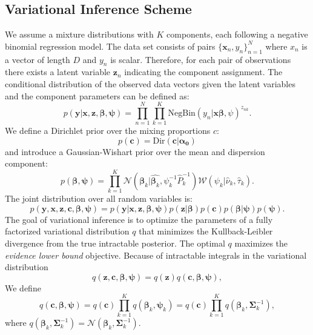 \documentclass[a4paper,UKenglish]{oasics-v2016}
\begin{document}
\subsection{Variational Inference Scheme}
We assume a mixture distributions with $K$ components, each following a negative binomial regression model.
The data set consists of pairs $\lbrace \mathbf{x}_n, y_n \rbrace^N_{n=1}$ where $x_n$ is a vector of length $D$ and $y_n$ is scalar. Therefore, for each pair of observations %
there exists a latent variable $\mathbf{z}_n$ indicating the component assignment. The conditional distribution of the observed data vectors given the latent variables and the component parameters can be defined as:
$$
p(\mathbf{y}|\mathbf{x},\mathbf{z},\boldsymbol{\beta},\boldsymbol{\psi}) = \prod_{n=1}^N \prod_{k=1}^{K} \text{NegBin}(y_n|\boldsymbol{x}\boldsymbol{\beta},\psi)^{z_{nk}}.%
$$
We define a Dirichlet prior over the mixing proportions $c$:
$$
p(\mathbf{c}) = \text{Dir}(\mathbf{c}|\boldsymbol{\alpha_0})
$$
and introduce a Gaussian-Wishart prior over the mean and dispersion component:
$$
p(\boldsymbol{\beta}, \boldsymbol{\psi})=\prod_{k=1}^{K}\mathcal{N}(\boldsymbol{\beta}_k|\hat{\boldsymbol{\beta}_k},\psi_k^{-1} \hat P_k^{-1}) \mathcal{W}(\psi_k|\hat \nu_k, \hat \tau_k).
$$
The joint distribution over all random variables is:
$$
p(\mathbf{y},\mathbf{x},\mathbf{z},\boldsymbol{c},\boldsymbol{\beta},\boldsymbol{\psi})=p(\mathbf{y}|\mathbf{x}, \mathbf{z},\boldsymbol \beta,\boldsymbol \psi)p(\boldsymbol{z}|\boldsymbol \beta)p(\boldsymbol{c})p(\boldsymbol{\beta}|\boldsymbol \psi)p(\boldsymbol \psi).
$$
The goal of variational inference is to optimize the parameters of a fully factorized variational distribution $q$ that minimizes the Kullback-Leibler divergence from the true intractable posterior.
The optimal $q$ maximizes the \emph{evidence lower bound} objective. Because of intractable integrals in the variational distribution
$$
q(\mathbf{z},\mathbf{c},\boldsymbol{\beta},\boldsymbol{\psi})=q(\mathbf{z})q(\mathbf{c},\boldsymbol{\beta},\boldsymbol{\psi}),
$$ We define
$$
q(\mathbf{c},\boldsymbol{\beta},\boldsymbol{\psi})= q(\mathbf{c})\prod_{k=1}^{K}q(\boldsymbol{\beta}_k,\boldsymbol{\psi}_k)= q(\mathbf{c})\prod_{k=1}^{K}q(\boldsymbol{\beta}_k,\boldsymbol\Sigma^{-1}_k),
$$
where $q(\boldsymbol{\beta}_k,\boldsymbol\Sigma^{-1}_k)=\mathcal{N}(\boldsymbol{\beta}_k,\boldsymbol\Sigma^{-1}_k).
$
\end{document}
